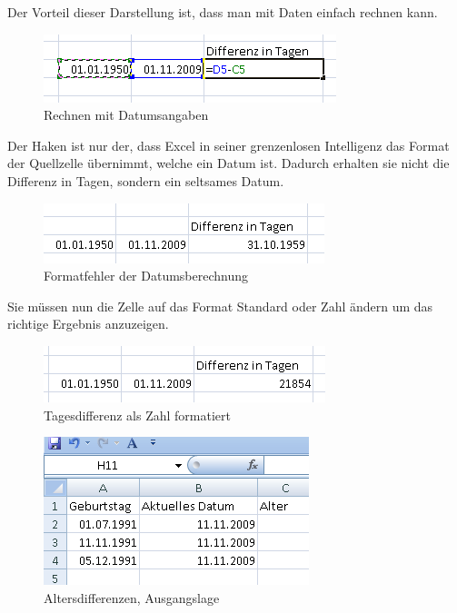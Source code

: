 
Der Vorteil dieser Darstellung ist, dass man mit Daten einfach rechnen kann.
	\begin{figure}[H]
		\centering
		\includegraphics{images/datumdiff.png}
		\caption{Rechnen mit Datumsangaben}
		\label{fig:datumdiff}
	\end{figure}


Der Haken ist nur der, dass Excel in seiner grenzenlosen Intelligenz das Format der Quellzelle übernimmt, welche ein Datum ist. Dadurch erhalten sie nicht die Differenz in Tagen, sondern ein seltsames Datum.
	\begin{figure}[H]
		\centering
		\includegraphics{images/datumdiff2.png}
		\caption{Formatfehler der Datumsberechnung}
		\label{fig:datumdiff2}
	\end{figure}




Sie müssen nun die Zelle auf das Format Standard oder Zahl ändern um das richtige Ergebnis anzuzeigen.
	\begin{figure}[H]
		\centering
		\includegraphics{images/datumdiff3.png}
		\caption{Tagesdifferenz als Zahl formatiert}
		\label{fig:datumdiff3}
	\end{figure}



	\begin{figure}[H]
		\centering
		\includegraphics{images/alter1.png}
		\caption{Altersdifferenzen, Ausgangslage}
		\label{fig:alter1}

	\end{figure}



